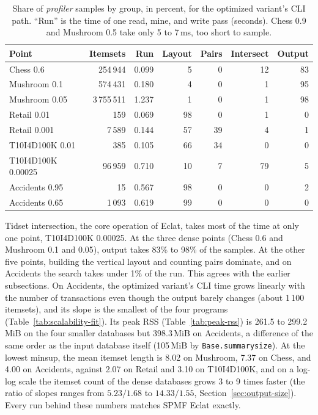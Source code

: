 \begin{table}[t]
\centering
\footnotesize
\setlength{\tabcolsep}{1.5pt}
\caption{Share of \emph{profiler} samples by group, in percent, for the optimized
variant's CLI path. ``Run'' is the time of one read, mine, and write pass (seconds).
Chess 0.9 and Mushroom 0.5 take only 5 to 7\,ms, too short to sample.}
\label{tab:stage-profile}
\begin{tabular}{lrrrrrr}
\hline
Point & Itemsets & Run & Layout & Pairs & Intersect & Output \\
\hline
Chess 0.6 & 254\,944 & 0.099 & 5 & 0 & 12 & 83 \\
Mushroom 0.1 & 574\,431 & 0.180 & 4 & 0 & 1 & 95 \\
Mushroom 0.05 & 3\,755\,511 & 1.237 & 1 & 0 & 1 & 98 \\
Retail 0.01 & 159 & 0.069 & 98 & 0 & 1 & 0 \\
Retail 0.001 & 7\,589 & 0.144 & 57 & 39 & 4 & 1 \\
T10I4D100K 0.01 & 385 & 0.105 & 66 & 34 & 0 & 0 \\
T10I4D100K 0.00025 & 96\,959 & 0.710 & 10 & 7 & 79 & 5 \\
Accidents 0.95 & 15 & 0.567 & 98 & 0 & 0 & 2 \\
Accidents 0.65 & 1\,093 & 0.619 & 99 & 0 & 0 & 0 \\
\hline
\end{tabular}
\end{table}

Tidset intersection, the core operation of Eclat, takes most of the time at only one
point, T10I4D100K 0.00025. At the three dense points (Chess 0.6 and Mushroom
0.1 and 0.05), output takes 83\% to 98\% of the samples. At the other five points,
building the vertical layout and counting pairs dominate, and on Accidents the search
takes under 1\% of the run. This agrees with the earlier subsections. On Accidents, the
optimized variant's CLI time grows linearly with the number of transactions even though
the output barely changes (about 1\,100 itemsets), and its slope is the smallest of the
four programs (Table~\ref{tab:scalability-fit}). Its peak RSS (Table~\ref{tab:peak-rss})
is 261.5 to 299.2\,MiB on the four smaller databases but 398.3\,MiB on Accidents, a
difference of the same order as the input database itself (105\,MiB by
\texttt{Base.summarysize}). At the lowest minsup, the mean itemset length is 8.02 on
Mushroom, 7.37 on Chess, and 4.00 on Accidents, against 2.07 on Retail and 3.10 on
T10I4D100K, and on a log-log scale the itemset count of the dense databases grows 3 to 9
times faster (the ratio of slopes ranges from $5.23/1.68$ to $14.33/1.55$,
Section~\ref{sec:output-size}). Every run behind these numbers matches SPMF Eclat exactly.

